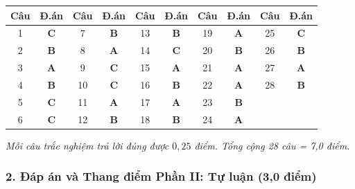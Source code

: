 \documentclass[12pt, a4paper]{article}
\begin{document}
\begin{center}
\begin{tabular}{|c|c|c|c|c|c|c|c|c|c|}
\hline
\textbf{Câu} & \textbf{Đ.án} & \textbf{Câu} & \textbf{Đ.án} & \textbf{Câu} & \textbf{Đ.án} & \textbf{Câu} & \textbf{Đ.án} & \textbf{Câu} & \textbf{Đ.án} \\ \hline
1 & \textbf{C} & 7 & \textbf{B} & 13 & \textbf{B} & 19 & \textbf{A} & 25 & \textbf{C} \\ \hline
2 & \textbf{B} & 8 & \textbf{A} & 14 & \textbf{C} & 20 & \textbf{B} & 26 & \textbf{B} \\ \hline
3 & \textbf{A} & 9 & \textbf{C} & 15 & \textbf{A} & 21 & \textbf{A} & 27 & \textbf{A} \\ \hline
4 & \textbf{B} & 10 & \textbf{C} & 16 & \textbf{B} & 22 & \textbf{A} & 28 & \textbf{B} \\ \hline
5 & \textbf{C} & 11 & \textbf{A} & 17 & \textbf{A} & 23 & \textbf{B} & & \\ \hline
6 & \textbf{C} & 12 & \textbf{B} & 18 & \textbf{B} & 24 & \textbf{A} & & \\ \hline
\end{tabular}
\end{center}

\textit{Mỗi câu trắc nghiệm trả lời đúng được $0{,}25$ điểm. Tổng cộng 28 câu = 7,0 điểm.}

\subsubsection*{2. Đáp án và Thang điểm Phần II: Tự luận (3,0 điểm)}
\end{document}
